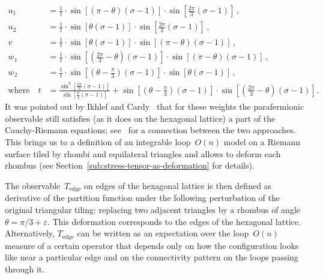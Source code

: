 \documentclass[reqno,11pt,a4paper]{amsart}
\theoremstyle{remark}
\newcommand{\Te}{T_{\mathrm{edge}}}       \newcommand{\Ce}{c_{\mathrm{edge}}}
\begin{document}
\begin{align}
\label{eq_u1}
u_1&=\tfrac{1}{t}\cdot\sin[(\pi-\theta)(\sigma-1)]\cdot\sin[\tfrac{2\pi}{3}(\sigma - 1)]\,,\\
\label{eq_u2}
u_2&=\tfrac{1}{t}\cdot\sin[\theta (\sigma - 1)]\cdot\sin[\tfrac{2\pi}{3}(\sigma - 1)]\,,\\
\label{eq_v}
v&=\tfrac{1}{t}\cdot\sin[\theta (\sigma - 1)]\cdot\sin[(\pi-\theta)(\sigma - 1)]\,,\\
\label{eq_w1}
w_1&=\tfrac{1}{t}\cdot\sin[(\tfrac{2\pi}{3}-\theta)(\sigma-1)]\cdot\sin[(\pi-\theta)(\sigma - 1)]\,,\\
\label{eq_w2}
w_2&=\tfrac{1}{t}\cdot\sin[(\theta-\tfrac{\pi}{3})(\sigma - 1)]\cdot\sin[\theta (\sigma - 1)]\,,\\
\text{where} \quad
t&=\frac{\sin^3[\tfrac{2\pi}{3}(\sigma - 1)]}{\sin[\tfrac{\pi}{3}(\sigma - 1)]}+
\sin[(\theta-\tfrac{\pi}{3})(\sigma - 1)]\cdot \sin[(\tfrac{2\pi}{3}-\theta)(\sigma - 1)]. \nonumber
\end{align}
It was pointed out by Ikhlef and Cardy~\cite{IkhCar09} that for these weights the parafermionic observable still satisfies (as it does on the hexagonal lattice) a part of the Cauchy-Riemann equations; see~\cite{AlaBat14} for a connection between the two approaches.
This brings us to a definition of an integrable loop~$O(n)$ model on a Riemann surface tiled by rhombi and equilateral triangles
and allows to deform each rhombus (see Section~\ref{sub:stress-tensor-as-deformation} for details).

The observable~$\Te$ on edges of the hexagonal lattice is then defined as derivative of the partition function under the following perturbation of the original triangular tiling:
replacing two adjacent triangles by a rhombus of angle~$\theta=\pi/3 +\varepsilon$.
This deformation corresponds to the edges of the hexagonal lattice.
Alternatively, $\Te$ can be written as an expectation over the loop~$O(n)$ measure of a certain operator that depends only on how the configuration looks like near a particular edge and on the connectivity pattern on the loops passing through it.
\end{document}
